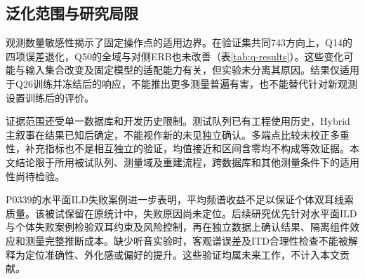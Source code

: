 \subsection{泛化范围与研究局限}
观测数量敏感性揭示了固定操作点的适用边界。在验证集共同743方向上，Q14的四项误差退化，Q50的全域与对侧ERB也未改善（表\ref{tab:q-results}）。这些变化可能与输入集合改变及固定模型的适配能力有关，但实验未分离其原因。结果仅适用于Q26训练并冻结后的响应，不能推出更多测量普遍有害，也不能替代针对新观测设置训练后的评价。

证据范围还受单一数据库和开发历史限制。测试队列已有工程使用历史，Hybrid主叙事在结果已知后确定，不能视作新的未见独立确认。多端点比较未校正多重性，补充指标也不是相互独立的验证，均值接近和区间含零均不构成等效证据。本文结论限于所用被试队列、测量域及重建流程，跨数据库和其他测量条件下的适用性尚待检验。

P0339的水平面ILD失败案例进一步表明，平均频谱收益不足以保证个体双耳线索质量。该被试保留在原统计中，失败原因尚未定位。后续研究优先针对水平面ILD与个体失败案例检验双耳约束及风险控制，再在独立数据上确认结果、隔离组件效应和测量完整推断成本。缺少听音实验时，客观谱误差及ITD合理性检查不能被解释为定位准确性、外化感或偏好的提升。这些验证均属未来工作，不计入本文贡献。
